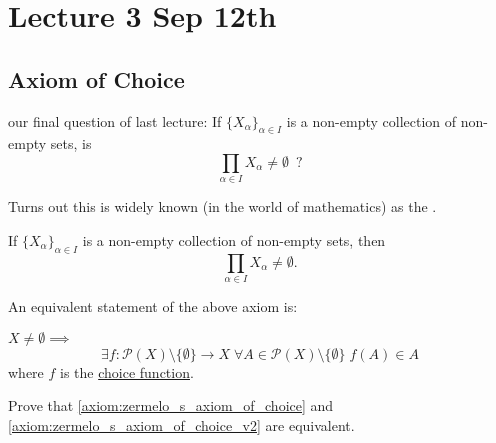 \documentclass[notoc,notitlepage]{tufte-book}
\begin{document}


\chapter{Lecture 3 Sep 12th}%
\label{chp:lecture_3_sep_12th}

\section{Axiom of Choice}%
\label{sec:axiom_of_choice}

 our final question of last lecture: If $\{ X_\alpha \}_{\alpha \in I}$ is a non-empty collection of non-empty sets, is
\begin{equation*}
  \prod_{\alpha \in I} X_\alpha \neq \emptyset \enspace ?
\end{equation*}

Turns out this is widely known (in the world of mathematics) as the .

\begin{axiom}
\label{axiom:zermelo_s_axiom_of_choice}
  If $\{ X_\alpha \}_{\alpha \in I}$ is a non-empty collection of non-empty sets, then
  \begin{equation*}
    \prod_{\alpha \in I} X_\alpha \neq \emptyset.
  \end{equation*}
\end{axiom}

An equivalent statement of the above axiom is:

\begin{axiom}
\label{axiom:zermelo_s_axiom_of_choice_v2}
  $X \neq \emptyset \implies$
  \begin{equation*}
    \exists f : \mathcal{P}(X) \setminus \{ \emptyset \} \to X \; \forall A \in \mathcal{P}(X) \setminus \{ \emptyset \} \; f(A) \in A
  \end{equation*}
  where $f$ is the \hyperref[defn:choice_function]{choice function}.
\end{axiom}

\begin{ex}
  Prove that \cref{axiom:zermelo_s_axiom_of_choice} and \cref{axiom:zermelo_s_axiom_of_choice_v2} are equivalent.
\end{ex}
\end{document}

